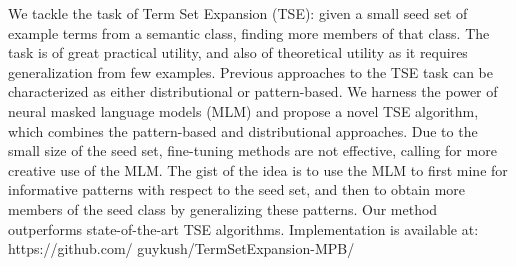 We tackle the task of Term Set Expansion (TSE): given a small seed set of example terms from a semantic class, finding more members of that class. The task is of great practical utility, and also of theoretical utility as it requires generalization from few examples. Previous approaches to the TSE task can be characterized as either distributional or pattern-based. We harness the power of neural masked language models (MLM) and propose a novel TSE algorithm, which combines the pattern-based and distributional approaches. Due to the small size of the seed set, fine-tuning methods are not effective, calling for more creative use of the MLM. The gist of the idea is to use the MLM to first mine for informative patterns with respect to the seed set, and then to obtain more members of the seed class by generalizing these patterns. Our method outperforms state-of-the-art TSE algorithms. Implementation is available at: https://github.com/ guykush/TermSetExpansion-MPB/

